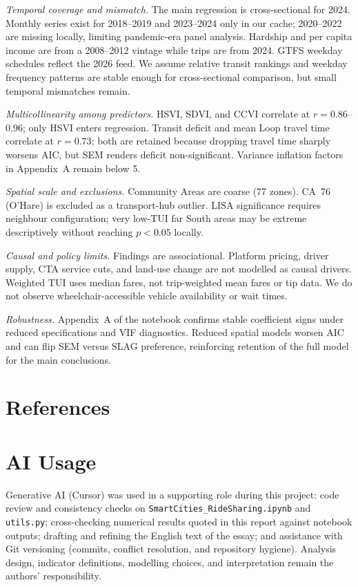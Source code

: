 \documentclass[10pt, a4paper]{article}
\begin{document}
\textit{Temporal coverage and mismatch.} The main regression is cross-sectional for 2024. Monthly series exist for 2018--2019 and 2023--2024 only in our cache; 2020--2022 are missing locally, limiting pandemic-era panel analysis. Hardship and per capita income are from a 2008--2012 vintage while trips are from 2024. GTFS weekday schedules reflect the 2026 feed. We assume relative transit rankings and weekday frequency patterns are stable enough for cross-sectional comparison, but small temporal mismatches remain.

\textit{Multicollinearity among predictors.} HSVI, SDVI, and CCVI correlate at $r=0.86$--$0.96$; only HSVI enters regression. Transit deficit and mean Loop travel time correlate at $r=0.73$; both are retained because dropping travel time sharply worsens AIC, but SEM renders deficit non-significant. Variance inflation factors in Appendix~A remain below 5.

\textit{Spatial scale and exclusions.} Community Areas are coarse (77 zones). CA~76 (O'Hare) is excluded as a transport-hub outlier. LISA significance requires neighbour configuration; very low-TUI far South areas may be extreme descriptively without reaching $p<0.05$ locally.

\textit{Causal and policy limits.} Findings are associational. Platform pricing, driver supply, CTA service cuts, and land-use change are not modelled as causal drivers. Weighted TUI uses median fares, not trip-weighted mean fares or tip data. We do not observe wheelchair-accessible vehicle availability or wait times.

\textit{Robustness.} Appendix~A of the notebook confirms stable coefficient signs under reduced specifications and VIF diagnostics. Reduced spatial models worsen AIC and can flip SEM versus SLAG preference, reinforcing retention of the full model for the main conclusions.

\newpage
{}
\section*{References}



\newpage
\appendix
\section{AI Usage}
Generative AI (Cursor) was used in a supporting role during this project: code review and consistency checks on \texttt{SmartCities\_RideSharing.ipynb} and \texttt{utils.py}; cross-checking numerical results quoted in this report against notebook outputs; drafting and refining the English text of the essay; and assistance with Git versioning (commits, conflict resolution, and repository hygiene). Analysis design, indicator definitions, modelling choices, and interpretation remain the authors' responsibility.
\end{document}
